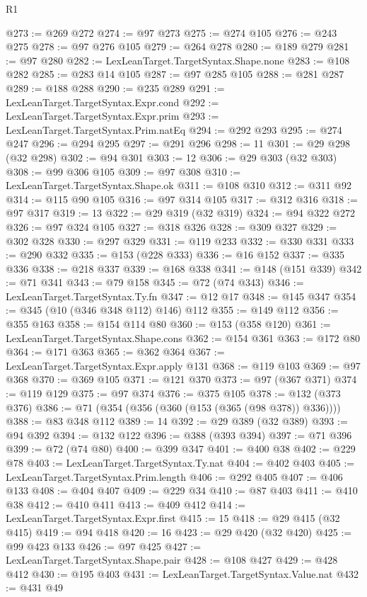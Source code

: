 \begin{lexlean}{R1}
\begin{coremodule}
@273 := @269 @272
@274 := @97 @273
@275 := @274 @105
@276 := @243 @275
@278 := @97 @276 @105
@279 := @264 @278
@280 := @189 @279
@281 := @97 @280
@282 := LexLeanTarget.TargetSyntax.Shape.none
@283 := @108 @282
@285 := @283 @14 @105
@287 := @97 @285 @105
@288 := @281 @287
@289 := @188 @288
@290 := @235 @289
@291 := LexLeanTarget.TargetSyntax.Expr.cond
@292 := LexLeanTarget.TargetSyntax.Expr.prim
@293 := LexLeanTarget.TargetSyntax.Prim.natEq
@294 := @292 @293
@295 := @274 @247
@296 := @294 @295
@297 := @291 @296
@298 := 11
@301 := @29 @298 (@32 @298)
@302 := @94 @301
@303 := 12
@306 := @29 @303 (@32 @303)
@308 := @99 @306 @105
@309 := @97 @308
@310 := LexLeanTarget.TargetSyntax.Shape.ok
@311 := @108 @310
@312 := @311 @92
@314 := @115 @90 @105
@316 := @97 @314 @105
@317 := @312 @316
@318 := @97 @317
@319 := 13
@322 := @29 @319 (@32 @319)
@324 := @94 @322 @272
@326 := @97 @324 @105
@327 := @318 @326
@328 := @309 @327
@329 := @302 @328
@330 := @297 @329
@331 := @119 @233
@332 := @330 @331
@333 := @290 @332
@335 := @153 (@228 @333)
@336 := @16 @152
@337 := @335 @336
@338 := @218 @337
@339 := @168 @338
@341 := @148 (@151 @339)
@342 := @71 @341
@343 := @79 @158
@345 := @72 (@74 @343)
@346 := LexLeanTarget.TargetSyntax.Ty.fn
@347 := @12 @17
@348 := @145 @347
@354 := @345 (@10 (@346 @348 @112) @146) @112
@355 := @149 @112
@356 := @355 @163
@358 := @154 @114 @80
@360 := @153 (@358 @120)
@361 := LexLeanTarget.TargetSyntax.Shape.cons
@362 := @154 @361
@363 := @172 @80
@364 := @171 @363
@365 := @362 @364
@367 := LexLeanTarget.TargetSyntax.Expr.apply @131
@368 := @119 @103
@369 := @97 @368
@370 := @369 @105
@371 := @121 @370
@373 := @97 (@367 @371)
@374 := @119 @129
@375 := @97 @374
@376 := @375 @105
@378 := @132 (@373 @376)
@386 := @71 (@354 (@356 (@360 (@153 (@365 (@98 @378)) @336))))
@388 := @83 @348 @112
@389 := 14
@392 := @29 @389 (@32 @389)
@393 := @94 @392
@394 := @132 @122
@396 := @388 (@393 @394)
@397 := @71 @396
@399 := @72 (@74 @80)
@400 := @399 @347
@401 := @400 @38
@402 := @229 @78
@403 := LexLeanTarget.TargetSyntax.Ty.nat
@404 := @402 @403
@405 := LexLeanTarget.TargetSyntax.Prim.length
@406 := @292 @405
@407 := @406 @133
@408 := @404 @407
@409 := @229 @34
@410 := @87 @403
@411 := @410 @38
@412 := @410 @411
@413 := @409 @412
@414 := LexLeanTarget.TargetSyntax.Expr.first
@415 := 15
@418 := @29 @415 (@32 @415)
@419 := @94 @418
@420 := 16
@423 := @29 @420 (@32 @420)
@425 := @99 @423 @133
@426 := @97 @425
@427 := LexLeanTarget.TargetSyntax.Shape.pair
@428 := @108 @427
@429 := @428 @412
@430 := @195 @403
@431 := LexLeanTarget.TargetSyntax.Value.nat
@432 := @431 @49

\end{coremodule}
\end{lexlean}
